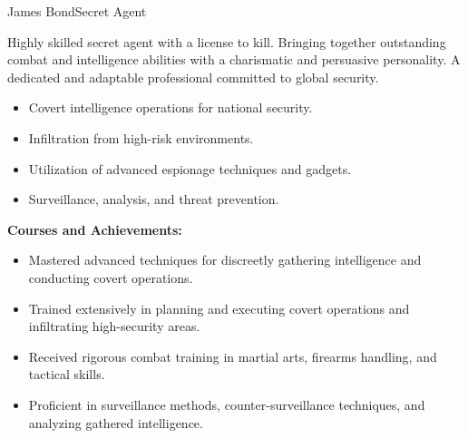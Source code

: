 \documentclass{article}
\begin{document}
\begin{cv}[avatar]{James Bond}{Secret Agent}


Highly skilled secret agent with a license to kill. 
Bringing together outstanding combat and intelligence abilities with a charismatic and persuasive personality. 
A dedicated and adaptable professional committed to global security.



\begin{cvevent}[present][1962]
    \begin{itemize}
        \item Covert intelligence operations for national security.
        \item Infiltration from high-risk environments.
        \item Utilization of advanced espionage techniques and gadgets.
        \item Surveillance, analysis, and threat prevention.
    \end{itemize}
\end{cvevent}



\begin{cvevent}[1962][1958]
    \textbf{Courses and Achievements:}
    \begin{itemize}
        \item Mastered advanced techniques for discreetly gathering intelligence and conducting covert operations.
        \item Trained extensively in planning and executing covert operations and infiltrating high-security areas.
        \item Received rigorous combat training in martial arts, firearms handling, and tactical skills.
        \item Proficient in surveillance methods, counter-surveillance techniques, and analyzing gathered intelligence.
    \end{itemize}
\end{cvevent}





\end{cv}
\end{document}
